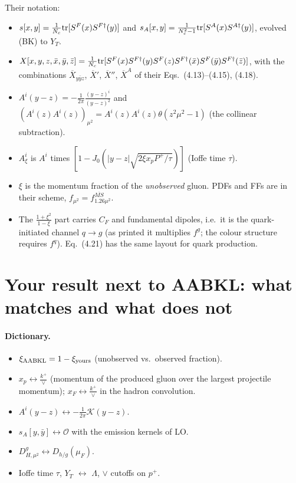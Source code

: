 \documentclass[10pt]{article}
\numberwithin{equation}{section}
\newcommand{\OO}{\mathcal O}
\newcommand{\KK}{\mathcal K}
\begin{document}
Their notation:
\begin{itemize}
\item $s[x,y]=\frac{1}{N_c}{\rm tr}[S^F(x)S^{F\dagger}(y)]$ and $s_A[x,y]=\frac{1}{N_c^2-1}{\rm tr}[S^A(x)S^{A\dagger}(y)]$, evolved (BK) to $Y_T$.
\item $X[x,y,z,\bar x,\bar y,\bar z]=\frac{1}{N_c}{\rm tr}[S^F(x)S^{F\dagger}(y)S^F(z)S^{F\dagger}(\bar x)S^F(\bar y)S^{F\dagger}(\bar z)]$, with the combinations $\overline X_{y\bar yz}$, $\overline X'$, $\overline X''$, $\overline X^A$ of their Eqs.~(4.13)--(4.15), (4.18).
\item $A^i(y-z)=-\frac{1}{2\pi}\frac{(y-z)^i}{(y-z)^2}$ and $(A^i(z)A^i(z))_{\mu^2}=A^i(z)A^i(z)\theta(z^2\mu^2-1)$ (the collinear subtraction).
\item $A^i_\xi$ is $A^i$ times $[1-J_0(|y-z|\sqrt{2\xi x_pP^+/\tau})]$ (Ioffe time $\tau$).
\item $\xi$ is the momentum fraction of the \emph{unobserved} gluon. PDFs and FFs are in their scheme, $f_{\mu^2}=f^{\overline{MS}}_{1.26\mu^2}$.
\item The $\frac{1+\xi^2}{1-\xi}$ part carries $C_F$ and fundamental dipoles, i.e.\ it is the quark-initiated channel $q\to g$ (as printed it multiplies $f^g$; the colour structure requires $f^q$). Eq.~(4.21) has the same layout for quark production.
\end{itemize}

\section{Your result next to AABKL: what matches and what does not}\label{sec:cmp}
\paragraph{Dictionary.}
\begin{itemize}
\item $\xi_{\rm AABKL}=1-\xi_{\rm yours}$ (unobserved vs.\ observed fraction).
\item $x_p\leftrightarrow\frac{k^+}{\vee}$ (momentum of the produced gluon over the largest projectile momentum); $x_F\leftrightarrow\frac{k^+}{\vee}$ in the hadron convolution.
\item $A^i(y-z)\leftrightarrow-\frac{1}{2\pi}\KK(y-z)$.
\item $s_A[y,\bar y]\leftrightarrow\OO$ with the emission kernels of LO.
\item $D^g_{H,\mu^2}\leftrightarrow D_{h/g}(\mu_F)$.
\item Ioffe time $\tau$, $Y_T$ $\leftrightarrow$ $\Lambda$, $\vee$ cutoffs on $p^+$.
\end{itemize}
\end{document}
